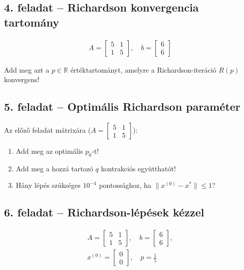 \documentclass[a4paper,12pt]{article}
\begin{document}
\subsection*{4. feladat -- Richardson konvergencia tartomány}

\[
\begin{gathered}
A = \begin{bmatrix}5&1\\1&5\end{bmatrix},\quad b = \begin{bmatrix}6\\6\end{bmatrix}
\end{gathered}
\]

Add meg azt a $p\in\mathbb{R}$ értéktartományt, amelyre a Richardson-iteráció $R(p)$ konvergens!


\subsection*{5. feladat -- Optimális Richardson paraméter}

Az előző feladat mátrixára ($A=\begin{bmatrix}5&1\\1&5\end{bmatrix}$):

\begin{enumerate}[noitemsep,topsep=2pt]
  \item Add meg az optimális $p_0$-t!
  \item Add meg a hozzá tartozó $q$ kontrakciós együtthatót!
  \item Hány lépés szükséges $10^{-4}$ pontossághoz, ha $\|x^{(0)}-x^*\|\le 1$?
\end{enumerate}


\subsection*{6. feladat -- Richardson-lépések kézzel}

\[
\begin{gathered}
A = \begin{bmatrix}5&1\\1&5\end{bmatrix},\quad b = \begin{bmatrix}6\\6\end{bmatrix},\\
x^{(0)} = \begin{bmatrix}0\\0\end{bmatrix},\quad p = \tfrac{1}{5}
\end{gathered}
\]
\end{document}
